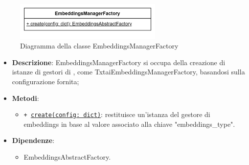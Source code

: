  \label{EmbeddingsManagerFactory}
\begin{figure}[H]
    \centering
    \includegraphics[width=0.65\textwidth]{assets/Backend/embeddings_manager_factory.png}
    \caption{Diagramma della classe EmbeddingsManagerFactory}
  \end{figure}
\begin{itemize}
    \item \textbf{Descrizione}: EmbeddingsManagerFactory si occupa della creazione di istanze di gestori di , come TxtaiEmbeddingsManagerFactory, basandosi sulla configurazione fornita;
    \item \textbf{Metodi}:
    \begin{itemize}
        \item \texttt{+ \underline{create(config: dict)}}: restituisce un'istanza del gestore di embeddings in base al valore associato alla chiave "embeddings\_type".
    \end{itemize}
    \item \textbf{Dipendenze}:
    \begin{itemize}
        \item EmbeddingsAbstractFactory.
    \end{itemize}
\end{itemize} 

